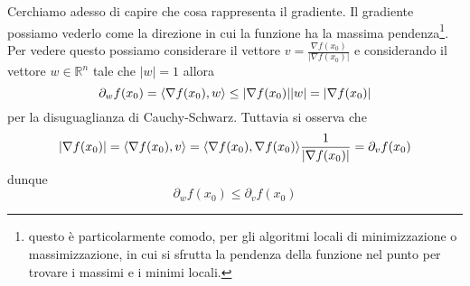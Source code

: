 \documentclass[openany]{book}
\begin{document}
\noindent Cerchiamo adesso di capire che cosa rappresenta il gradiente. Il gradiente possiamo vederlo come la direzione in cui la funzione ha la massima pendenza\footnote{questo è particolarmente comodo, per gli algoritmi locali di minimizzazione o massimizzazione, in cui si sfrutta la pendenza della funzione nel punto per trovare i massimi e i minimi locali.}. Per vedere questo possiamo considerare il vettore $v = \frac{\nabla f(x_0)}{|\nabla f(x_0)|}$ e considerando il vettore $w \in \mathbb{R}^n$ tale che $|w| = 1$ allora
$$
\partial_w f(x_0) = \langle \nabla{f(x_0)}, w \rangle \leq |\nabla{f(x_0)}||w| = |\nabla{f(x_0)}|
$$
per la disuguaglianza di Cauchy-Schwarz. Tuttavia si osserva che
$$
|\nabla{f(x_0)}| = \langle \nabla{f(x_0)}, v \rangle = \langle \nabla{f(x_0)}, \nabla{f(x_0)} \rangle \frac{1}{|\nabla{f(x_0)}|} = \partial_v f(x_0)
$$
dunque
$$
\partial_w f(x_0) \leq \partial_v f(x_0)
$$
\end{document}
